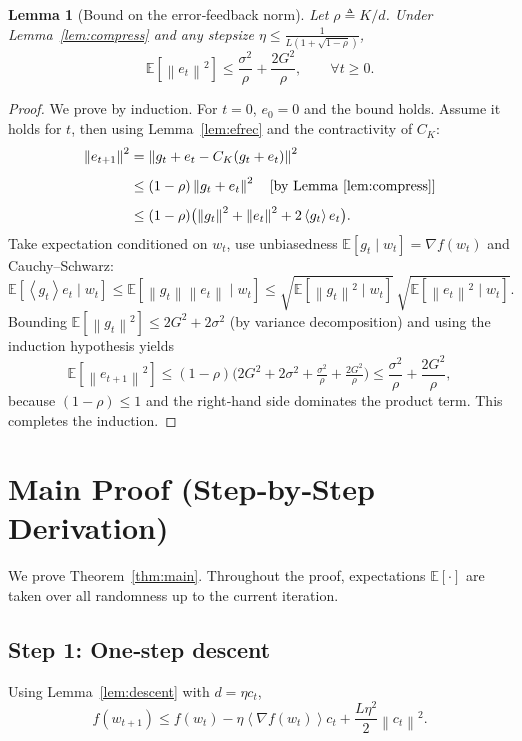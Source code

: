 \documentclass{article}
\newcommand{\EE}{\mathbb{E}}
\newcommand{\norm}[1]{\left\lVert #1 \right\rVert}
\newcommand{\inner}[1]{\left\langle #1 \right\rangle}
\newtheorem{lemma}{Lemma}
\begin{document}
\begin{lemma}[Bound on the error‑feedback norm]\label{lem:errorbound}
Let $\rho\triangleq K/d$. Under Lemma~\ref{lem:compress} and any stepsize $\eta\le\frac{1}{L(1+\sqrt{1-\rho})}$,
\[
    \EE\!\left[\norm{e_{t}}^{2}\right]\le\frac{\sigma^{2}}{\rho}+\frac{2G^{2}}{\rho},\qquad\forall t\ge0.
\]
\end{lemma}
\begin{proof}
We prove by induction.  
For $t=0$, $e_{0}=0$ and the bound holds.  
Assume it holds for $t$, then using Lemma~\ref{lem:efrec} and the contractivity of $C_{K}$:
\[
\begin{aligned}
\norm{e_{t+1}}^{2}
&=\norm{g_t+e_t-C_{K}(g_t+e_t)}^{2}
\\[4pt]
&\le\left(1-\rho\right)\norm{g_t+e_t}^{2}
\quad\text{[by Lemma~\ref{lem:compress}]}
\\[4pt]
&\le(1-\rho)\bigl(\norm{g_t}^{2}+\norm{e_t}^{2}+2\inner{g_t}{e_t}\bigr).
\end{aligned}
\]
Take expectation conditioned on $w_t$, use unbiasedness $\EE[g_t\mid w_t]=\nabla f(w_t)$ and Cauchy–Schwarz:
\[
\EE\!\left[\inner{g_t}{e_t}\mid w_t\right]\le
\EE\!\left[\norm{g_t}\norm{e_t}\mid w_t\right]
\le\sqrt{\EE[\norm{g_t}^{2}\mid w_t]}\,\sqrt{\EE[\norm{e_t}^{2}\mid w_t]}.
\]
Bounding $\EE[\norm{g_t}^{2}]\le 2G^{2}+2\sigma^{2}$ (by variance decomposition) and using the induction hypothesis yields
\[
\EE[\norm{e_{t+1}}^{2}]\le(1-\rho)\bigl(2G^{2}+2\sigma^{2}+\tfrac{\sigma^{2}}{\rho}+\tfrac{2G^{2}}{\rho}\bigr)
\le\frac{\sigma^{2}}{\rho}+\frac{2G^{2}}{\rho},
\]
because $(1-\rho)\le1$ and the right‑hand side dominates the product term. This completes the induction.
\end{proof}

\newpage

\section*{Main Proof (Step‑by‑Step Derivation)}

We prove Theorem~\ref{thm:main}. Throughout the proof, expectations $\EE[\cdot]$ are taken over all randomness up to the current iteration.

\subsection*{Step 1: One‑step descent}
Using Lemma~\ref{lem:descent} with $d=\eta c_t$,
\[
f(w_{t+1})\le f(w_t)-\eta\inner{\nabla f(w_t)}{c_t}+\frac{L\eta^{2}}{2}\norm{c_t}^{2}. \tag{2}
\]
\end{document}
